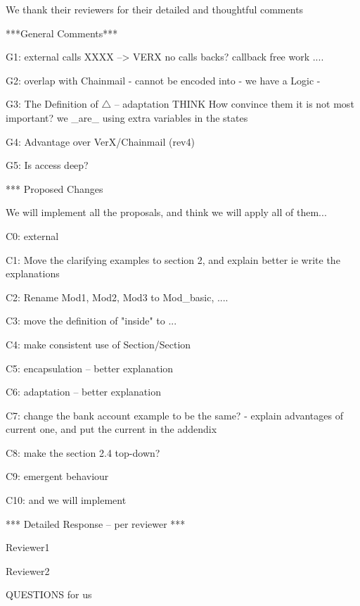 We thank their reviewers for their detailed and thoughtful comments 


***General Comments***

G1: external calls
XXXX
--> VERX no calls backs?
callback free work .... 

G2:  overlap with Chainmail
- cannot be encoded into
- we have a Logic
- %

G3: The Definition of $\triangle$ -- adaptation
THINK
How convince them it is not most important?
we _are_ using extra variables in the states

G4: Advantage over VerX/Chainmail (rev4)

G5: Is access deep?


*** Proposed Changes

We will implement all the proposals, and think we will apply all of them...

C0: external

C1: Move the clarifying examples to section 2, and explain better
ie write the explanations

C2: Rename Mod1, Mod2, Mod3 to Mod_{basic}, ....

C3: move the definition of "inside" to ...

C4: make consistent use of Section/Section

C5: encapsulation -- better explanation

C6: adaptation -- better explanation

C7: change the bank account example to be the same?
- explain advantages of current one, and put the current in the addendix

C8: make the section 2.4 top-down?

C9: emergent behaviour 

C10: and we will implement
 


*** Detailed Response -- per reviewer ***

Reviewer1

Reviewer2


QUESTIONS for us